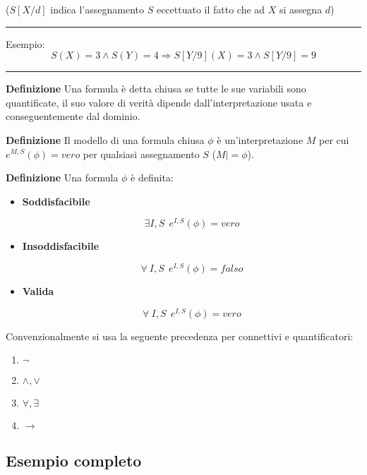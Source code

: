 \documentclass{article}
\begin{document}
 ($S[X/d]$ indica l'assegnamento $S$ eccettuato il fatto che ad $X$ si assegna $d$)

\noindent\rule{\textwidth}{0.5pt}

Esempio:
$$S(X)=3\wedge S(Y)=4\Rightarrow S[Y/9](X)=3\wedge S[Y/9]=9$$

\noindent\rule{\textwidth}{0.5pt}\newline

\noindent\textbf{Definizione} Una formula è detta chiusa se tutte le sue variabili sono quantificate, il suo valore di verità dipende dall'interpretazione usata e conseguentemente dal dominio.\newline

\noindent\textbf{Definizione} Il modello di una formula chiusa $\phi$ è un'interpretazione $M$ per cui $e^{M,S}(\phi)=vero$ per qualsiasi assegnamento $S$ ($M |=\phi$).\newline

\noindent\textbf{Definizione} Una formula $\phi$ è definita:
\begin{itemize}
    \item \textbf{Soddisfacibile}

        $$\exists I,S\ \ e^{I,S}(\phi)=vero$$

    \item \textbf{Insoddisfacibile}

        $$\forall\  I,S\ \ e^{I,S}(\phi)=falso$$

    \item \textbf{Valida}

        $$\forall\ I,S\ \ e^{I,S}(\phi)=vero$$\newline
    
\end{itemize}

\noindent Convenzionalmente si usa la seguente precedenza per connettivi e quantificatori:
\begin{enumerate}
    \item $\neg$
    \item $\wedge,\vee$
    \item $\forall,\exists$
    \item $\rightarrow$
\end{enumerate}

\newpage

\subsection{Esempio completo}
\end{document}

